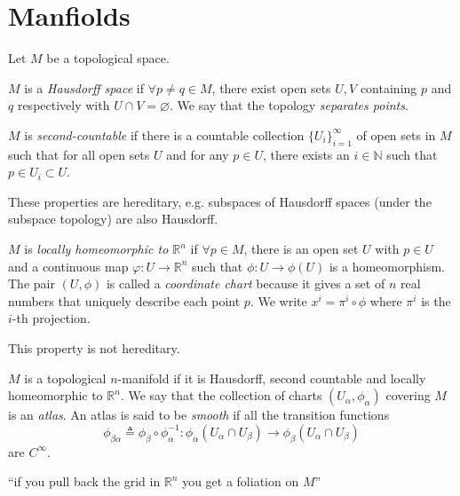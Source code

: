 \section{Manfiolds}

Let $M$ be a topological space.
\begin{defn}
$M$ is a \emph{Hausdorff space} if $\forall p \neq q \in M$,
there exist open sets $U, V$ containing $p$ and $q$ respectively
with $U \cap V = \varnothing$. We say that the topology
\emph{separates points}.
\end{defn}

\begin{defn}
$M$ is \emph{second-countable} if there is a countable collection
$\{U_i\}_{i=1}^\infty$ of open sets in $M$ such that for all open sets
$U$ and for any $p \in U$, there exists an $i \in \mathbb{N}$ such
that
$p \in U_i \subset U$.
\end{defn}

These properties are hereditary, e.g. subspaces of Hausdorff spaces (under the subspace
topology) are also Hausdorff.

\begin{defn}
$M$ is \emph{locally homeomorphic to $\mathbb{R}^n$} if
$\forall p \in M$, there is an open set $U$ with $p \in U$ and a
continuous map $\varphi: U \to \mathbb{R}^n$ such that
$\phi: U \to \phi(U)$ is a homeomorphism. The pair $(U, \phi)$ is
called a \emph{coordinate chart} because it gives a set of $n$ real numbers
that uniquely describe each point $p$. We write $x^i = \pi^i \circ
\phi$ where $\pi^i$ is the $i$-th projection.
\end{defn}
This property is not hereditary.

\begin{defn}
$M$ is a topological $n$-manifold if it is Hausdorff, second countable
and locally homeomorphic to $\mathbb{R}^n$. We say that the collection
of charts $(U_\alpha, \phi_\alpha)$ covering $M$ is an
\emph{atlas}. An atlas is said to be \emph{smooth} if all the
transition functions
$$
  \phi_{\beta\alpha}
\triangleq
  \phi_\beta \circ \phi_\alpha^{-1}
:   \phi_\alpha(U_\alpha \cap  U_\beta)
\to \phi_\beta(U_\alpha \cap U_\beta)
$$
are $C^\infty$.
\end{defn}

``if you pull back the grid in $\mathbb{R}^n$ you get a foliation on $M$''
